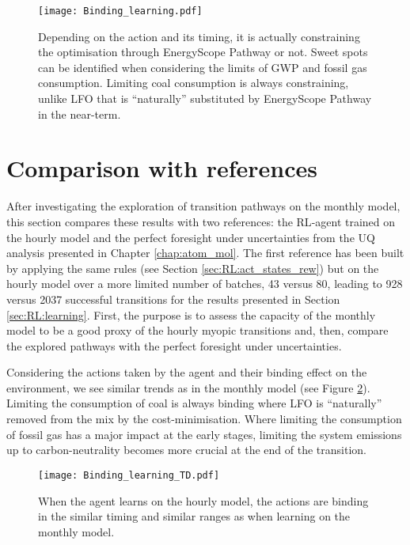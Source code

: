 \begin{figure}[!htbp]
\centering
\texttt{[image: Binding\_learning.pdf]}
\caption{Depending on the action and its timing, it is actually constraining the optimisation through EnergyScope Pathway or not. Sweet spots can be identified when considering the limits of \gls{GWP} and fossil gas consumption. Limiting coal consumption is always constraining, unlike \gls{LFO} that is ``naturally'' substituted by EnergyScope Pathway in the near-term.}
\label{fig:Binding_learning}
\end{figure}

\section{Comparison with references}
\label{sec:RL:testing}
After investigating the exploration of transition pathways on the monthly model, this section compares these results with two references: the \gls{RL}-agent trained on the hourly model and the perfect foresight under uncertainties from the \gls{UQ} analysis presented in Chapter \ref{chap:atom_mol}. The first reference has been built by applying the same rules (see Section \ref{sec:RL:act_states_rew}) but on the hourly model over a more limited number of batches, 43 versus 80, leading to 928 versus 2037 successful transitions for the results presented in Section \ref{sec:RL:learning}. First, the purpose is to assess the capacity of the monthly model to be a good proxy of the hourly myopic transitions and, then,  compare the explored pathways with the perfect foresight under uncertainties.

Considering the actions taken by the agent and their binding effect on the environment,  we see similar trends as in the monthly model (see Figure \ref{fig:Binding_learning_TD}). Limiting the consumption of coal is always binding where \gls{LFO} is ``naturally'' removed from the mix by the cost-minimisation. Where limiting the consumption of fossil gas has a major impact at the early stages, limiting the system emissions up to carbon-neutrality becomes more crucial at the end of the transition.

\begin{figure}[!htbp]
\centering
\texttt{[image: Binding\_learning\_TD.pdf]}
\caption{When the agent learns on the hourly model, the actions are binding in the similar timing and similar ranges as when learning on the monthly model. }
\label{fig:Binding_learning_TD}
\end{figure}

